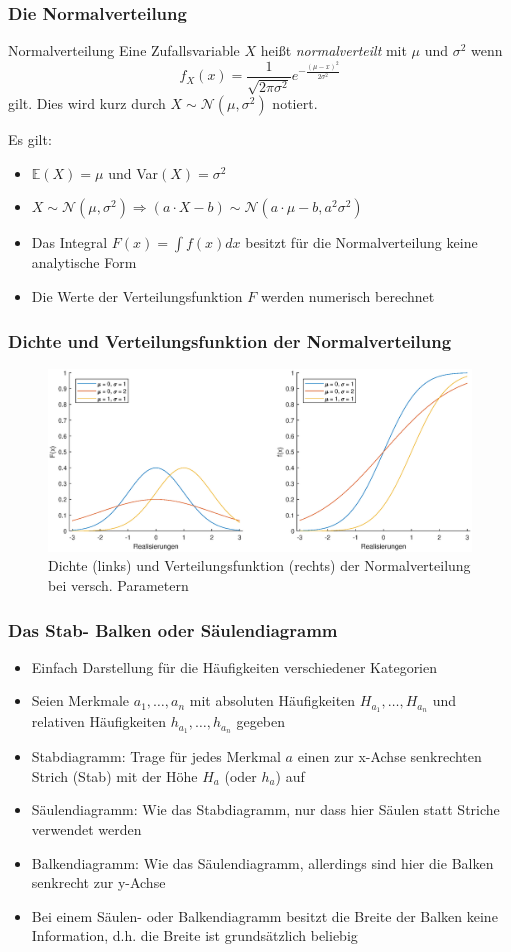 \begin{frame}
\frametitle{Die Normalverteilung}
\begin{block}{Normalverteilung}
Eine Zufallsvariable $X$ heißt \textit{normalverteilt} mit $\mu$ und $\sigma^2$ wenn
\[
f_X(x) = \frac{1}{\sqrt{2\pi\sigma^2}}e^{-\frac{(\mu-x)^2}{2\sigma^2}}
\]
gilt. Dies wird kurz durch $X\sim\mathcal{N}(\mu,\sigma^2)$ notiert. 
\end{block}
Es gilt:
\begin{itemize}[<+->]
\item $\mathbb{E}(X) = \mu$ und Var$(X) = \sigma^2$
\item $X\sim\mathcal{N}(\mu,\sigma^2) \Rightarrow (a\cdot X-b)\sim\mathcal{N}(a\cdot\mu -b,a^2\sigma^2)$
\item Das Integral $F(x) = \int f(x) dx$ besitzt für die Normalverteilung keine analytische Form
\item Die Werte der Verteilungsfunktion $F$ werden numerisch berechnet
\end{itemize}
\end{frame}
\begin{frame}
\frametitle{Dichte und Verteilungsfunktion der Normalverteilung}
\begin{figure}[hbtp]
\centering
\includegraphics[scale=0.5]{images/plot_normal_dist.eps}
\caption{Dichte (links) und Verteilungsfunktion (rechts) der Normalverteilung bei versch. Parametern}
\end{figure}
\end{frame}
\begin{frame}
\frametitle{Das Stab- Balken oder Säulendiagramm}
\begin{itemize}[<+->]
\item Einfach Darstellung für die Häufigkeiten verschiedener Kategorien
\item Seien Merkmale $a_1,\ldots,a_n$ mit absoluten Häufigkeiten $H_{a_1},\ldots,H_{a_n}$ und relativen Häufigkeiten $h_{a_1},\ldots,h_{a_n}$ gegeben
\item Stabdiagramm: Trage für jedes Merkmal $a$ einen zur x-Achse senkrechten Strich (Stab) mit der Höhe $H_a$ (oder $h_a$) auf
\item Säulendiagramm: Wie das Stabdiagramm, nur dass hier Säulen statt Striche verwendet werden
\item Balkendiagramm: Wie das Säulendiagramm, allerdings sind hier die Balken senkrecht zur y-Achse
\item Bei einem Säulen- oder Balkendiagramm besitzt die Breite der Balken keine Information, d.h. die Breite ist grundsätzlich beliebig
\end{itemize}
\end{frame}
